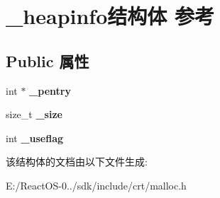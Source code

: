 \hypertarget{struct__heapinfo}{}\section{\+\_\+heapinfo结构体 参考}
\label{struct__heapinfo}
\subsection*{Public 属性}
\begin{DoxyCompactItemize}
\item 
\mbox{\label{struct__heapinfo_a5f573cebe024fe1e0e41ec402ba7b44b}} 
int $\ast$ {\bfseries \+\_\+pentry}
\item 
\mbox{\label{struct__heapinfo_ab4385d64a20d80d6191eceb6be9756f3}} 
size\+\_\+t {\bfseries \+\_\+size}
\item 
\mbox{\label{struct__heapinfo_a7edf165469431e59befa89c5803edcc8}} 
int {\bfseries \+\_\+useflag}
\end{DoxyCompactItemize}


该结构体的文档由以下文件生成\+:\begin{DoxyCompactItemize}
\item 
E\+:/\+React\+O\+S-\/0../sdk/include/crt/malloc.\+h\end{DoxyCompactItemize}
